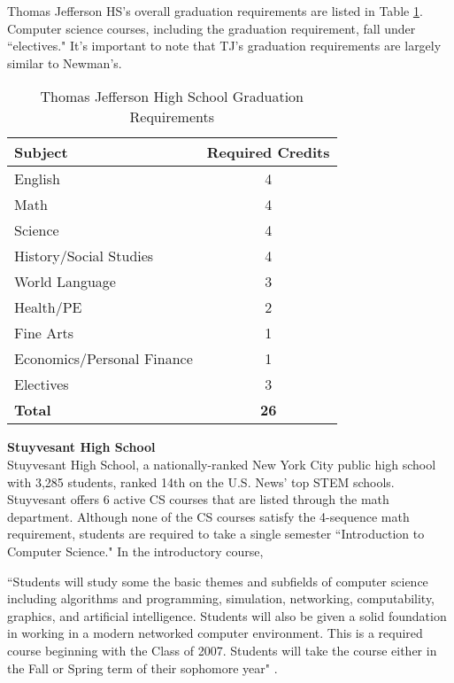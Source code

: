 Thomas Jefferson HS's overall graduation requirements are listed in Table \ref{tjtable}. Computer science courses, including the graduation requirement, fall under ``electives." It's important to note that TJ's graduation requirements are largely similar to Newman's. \par
\begin{table}[]
\centering
\caption{Thomas Jefferson High School Graduation Requirements \cite{tjreq}}
\label{tjtable}
\begin{tabular}{lc}
\textbf{Subject}       & \textbf{Required Credits} \\ \hline
English                & 4                     \\
Math                   & 4                     \\
Science                & 4                     \\
History/Social Studies & 4                     \\
World Language         & 3                     \\
Health/PE              & 2                     \\
Fine Arts              & 1                     \\
Economics/Personal Finance              & 1                     \\ 
Electives              & 3                     \\
\textbf{Total}         & \textbf{26}          
\end{tabular}
\end{table}
\textbf{Stuyvesant High School} \\
Stuyvesant High School, a nationally-ranked New York City public high school with 3,285 students, ranked 14th on the U.S. News' top STEM schools. Stuyvesant offers 6 active CS courses that are listed through the math department. Although none of the CS courses satisfy the 4-sequence math requirement, students are required to take a single semester ``Introduction to Computer Science." In the introductory course, 
\begin{blockquote}``Students will study some the basic themes and subfields of computer science including algorithms and programming, simulation, networking, computability, graphics, and artificial intelligence. Students will also be given a solid foundation in working in a modern networked computer environment. This is a required course beginning with the Class of 2007. Students will take the course either in the Fall or Spring term of their sophomore year" \cite{stuy}.
\end{blockquote} 
